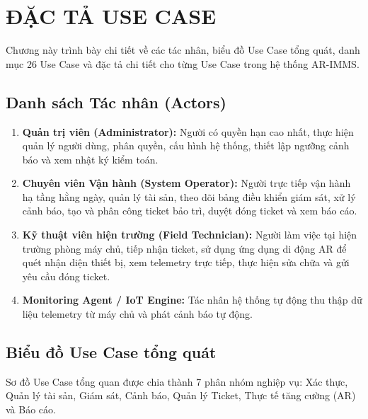 \chapter{ĐẶC TẢ USE CASE}

Chương này trình bày chi tiết về các tác nhân, biểu đồ Use Case tổng quát, danh mục 26 Use Case và đặc tả chi tiết cho từng Use Case trong hệ thống AR-IMMS.

\section{Danh sách Tác nhân (Actors)}
\begin{enumerate}
    \item \textbf{Quản trị viên (Administrator):} Người có quyền hạn cao nhất, thực hiện quản lý người dùng, phân quyền, cấu hình hệ thống, thiết lập ngưỡng cảnh báo và xem nhật ký kiểm toán.
    \item \textbf{Chuyên viên Vận hành (System Operator):} Người trực tiếp vận hành hạ tầng hằng ngày, quản lý tài sản, theo dõi bảng điều khiển giám sát, xử lý cảnh báo, tạo và phân công ticket bảo trì, duyệt đóng ticket và xem báo cáo.
    \item \textbf{Kỹ thuật viên hiện trường (Field Technician):} Người làm việc tại hiện trường phòng máy chủ, tiếp nhận ticket, sử dụng ứng dụng di động AR để quét nhận diện thiết bị, xem telemetry trực tiếp, thực hiện sửa chữa và gửi yêu cầu đóng ticket.
    \item \textbf{Monitoring Agent / IoT Engine:} Tác nhân hệ thống tự động thu thập dữ liệu telemetry từ máy chủ và phát cảnh báo tự động.
\end{enumerate}

\section{Biểu đồ Use Case tổng quát}
Sơ đồ Use Case tổng quan được chia thành 7 phân nhóm nghiệp vụ: Xác thực, Quản lý tài sản, Giám sát, Cảnh báo, Quản lý Ticket, Thực tế tăng cường (AR) và Báo cáo.

